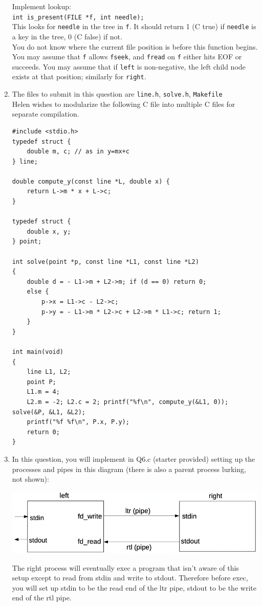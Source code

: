 \documentclass[11pt]{article}
\begin{document}
\begin{enumerate}
		Implement lookup:\\
		\Verb|int is_present(FILE *f, int needle);|\\
		This looks for \Verb|needle| in the tree in \Verb|f|. It should return 1 (C true) if \Verb|needle| is a key in the tree, 0 (C false) if not.\\

		You do not know where the current file position is before this function begins. You may assume that \Verb|f| allows \Verb|fseek|, and \Verb|fread| on \Verb|f| either hits EOF or succeeds. You may assume that if \Verb|left| is non-negative, the left child node exists at that position; similarly for \Verb|right|.
			

	\newpage
	\item The files to submit in this question are \Verb|line.h|, \Verb|solve.h|, \Verb|Makefile|\\
		Helen wishes to modularize the following C file into multiple C files for separate compilation.
		\begin{Verbatim}
#include <stdio.h>
typedef struct {
	double m, c; // as in y=mx+c
} line;

double compute_y(const line *L, double x) {
	return L->m * x + L->c;
}

typedef struct {
	double x, y;
} point;

int solve(point *p, const line *L1, const line *L2)
{
	double d = - L1->m + L2->m; if (d == 0) return 0;
	else {
		p->x = L1->c - L2->c;
		p->y = - L1->m * L2->c + L2->m * L1->c; return 1;
	}
}

int main(void)
{
	line L1, L2;
	point P;
	L1.m = 4;
	L2.m = -2; L2.c = 2; printf("%f\n", compute_y(&L1, 0)); solve(&P, &L1, &L2);
	printf("%f %f\n", P.x, P.y);
	return 0;
}
		\end{Verbatim}
	\newpage
		
		
		

	\newpage
	\item In this question, you will implement in Q6.c (starter provided) setting up the processes and pipes in this diagram (there is also a parent process lurking, not shown):\\[-5pt]
		\begin{center}
			\includegraphics[scale=0.8]{q6.png}
		\end{center}
		The right process will eventually exec a program that isn’t aware of this setup except to read from stdin and write to stdout. Therefore before exec, you will set up stdin to be the read end of the ltr pipe, stdout to be the write end of the rtl pipe.


\end{enumerate}
\end{document}
